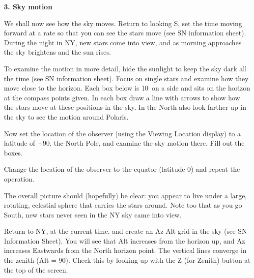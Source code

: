\newpage

\bigskip
\noindent
{\bf 3. Sky motion}

\medskip
\noindent
We shall now see how the sky moves. Return to looking S, set the
time moving forward at a rate so that you can see the stars move (see
SN information sheet). During the night in NY, new
stars come into view, and as morning approaches the sky brightens and
the sun rises.

To examine the motion in more detail, hide the sunlight to keep the
sky dark all the time (see SN information sheet).  Focus on single
stars and examine how they move close to the horizon. Each box below is
10\deg\ on a side and sits on the horizon at the compass points
given. In each box draw a line with arrows to show how the stars move
at these positions in the sky.  In the North also look farther up in
the sky to see the motion around Polaris.


        \begin{figure*}[h]
        \centerline{}
        \caption{}
         \end{figure*}


\noindent
Now set the location of the observer (using the Viewing Location display) to a
latitude of +90\deg, the North Pole, and examine the sky motion
there. Fill out the boxes.



        \begin{figure*}[h]
        \centerline{}
        \caption{}
         \end{figure*}

\noindent
Change the location of the observer to the equator (latitude 0\deg)
and repeat the operation.


        \begin{figure*}[h]
        \centerline{}
        \caption{}
         \end{figure*}



The overall picture should (hopefully) be clear: you appear to live
under a large, rotating, celestial sphere that carries the stars
around. Note too that as you go South, new stars never seen in the NY
sky came into view.

 
\bigskip
\noindent


\medskip
\noindent
Return to NY, at the current time, and create an Az-Alt grid in the sky
(see SN Information Sheet).  You will see that
Alt increases from the horizon up, and Az increases Eastwards from the
North horizon point. The vertical lines converge in the zenith (Alt =
90\deg). Check this by looking up with the Z (for Zenith) button at the
top of the screen.

